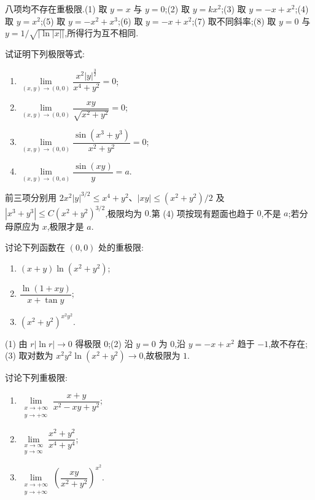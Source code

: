 \begin{solution}
    八项均不存在重极限.(1) 取 $y=x$ 与 $y=0$;(2) 取 $y=kx^2$;(3) 取 $y=-x+x^2$;(4) 取 $y=x^2$;(5) 取 $y=-x^2+x^3$;(6) 取 $y=-x+x^2$;(7) 取不同斜率;(8) 取 $y=0$ 与 $y=1/\sqrt{|\ln|x||}$,所得行为互不相同.
\end{solution}

\begin{example}
    试证明下列极限等式:
    \begin{enumerate}
        \item $\displaystyle\lim\limits_{(x,y)\to(0,0)}\dfrac{x^2|y|^{\frac{3}{2}}}{x^4+y^2}=0$;
        \item $\displaystyle\lim\limits_{(x,y)\to(0,0)}\dfrac{xy}{\sqrt{x^2+y^2}}=0$;
        \item $\displaystyle\lim\limits_{(x,y)\to(0,0)}\dfrac{\sin(x^3+y^3)}{x^2+y^2}=0$;
        \item $\displaystyle\lim\limits_{(x,y)\to(0,a)}\dfrac{\sin(xy)}{y}=a$.
    \end{enumerate}
\end{example}
\exampleblank

\begin{solution}
    前三项分别用 $2x^2|y|^{3/2}\leq x^4+y^2$、$|xy|\leq(x^2+y^2)/2$ 及 $|x^3+y^3|\leq C(x^2+y^2)^{3/2}$,极限均为 $0$.第 (4) 项按现有题面也趋于 $0$,不是 $a$;若分母原应为 $x$,极限才是 $a$.
\end{solution}

\begin{example}
    讨论下列函数在 $(0,0)$ 处的重极限:
    \begin{enumerate}
        \item $(x+y)\ln(x^2+y^2)$;
        \item $\displaystyle\dfrac{\ln(1+xy)}{x+\tan y}$;
        \item $(x^2+y^2)^{x^2y^2}$.
    \end{enumerate}
\end{example}
\exampleblank

\begin{solution}
    (1) 由 $r|\ln r|\to0$ 得极限 $0$;(2) 沿 $y=0$ 为 $0$,沿 $y=-x+x^2$ 趋于 $-1$,故不存在;(3) 取对数为 $x^2y^2\ln(x^2+y^2)\to0$,故极限为 $1$.
\end{solution}

\begin{example}
    讨论下列重极限:
    \begin{enumerate}
        \item $\displaystyle\lim\limits_{\substack{x\to+\infty\\y\to+\infty}}\dfrac{x+y}{x^2-xy+y^2}$;
        \item $\displaystyle\lim\limits_{\substack{x\to\infty\\y\to\infty}}\dfrac{x^2+y^2}{x^4+y^4}$;
        \item $\displaystyle\lim\limits_{\substack{x\to+\infty\\y\to+\infty}}\left(\dfrac{xy}{x^2+y^2}\right)^{x^2}$.
    \end{enumerate}
\end{example}
\exampleblank

